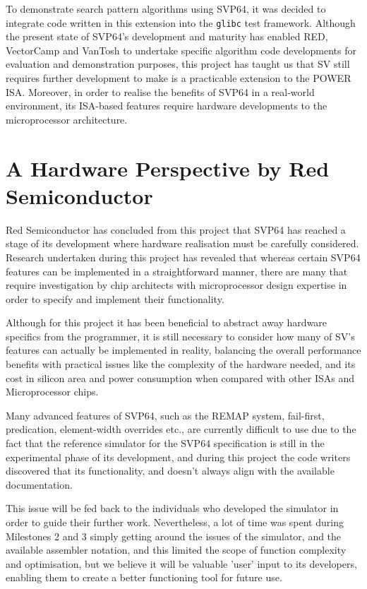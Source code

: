 To demonstrate search pattern algorithms using \acrshort{SVP64}, it was decided
to integrate code written in this extension into the \texttt{glibc}
test framework.
Although the present state of SVP64's development and maturity has enabled RED,
VectorCamp and VanTosh to undertake specific algorithm code developments for
evaluation and demonstration purposes, this project has taught us that
\acrshort{SV} still requires further development to make is a practicable
extension to the POWER ISA. Moreover, in order to realise the benefits of SVP64
in a real-world environment, its ISA-based features require hardware
developments to the microprocessor architecture.

\section{A Hardware Perspective by Red Semiconductor}

Red Semiconductor has concluded from this project that SVP64 has reached a
stage of its development where hardware realisation must be carefully
considered. Research undertaken during this project has revealed that whereas
certain SVP64 features can be implemented in a straightforward manner, there
are many that require investigation by chip architects with microprocessor
design expertise in order to specify and implement their functionality.

Although for this project it has been beneficial to abstract away hardware
specifics from the programmer, it is still necessary to consider how many of
\acrshort{SV}'s features can actually be implemented in reality,
balancing the overall performance benefits with practical issues like the
complexity of the hardware needed, and its cost in silicon area and power
consumption when compared with other ISAs and Microprocessor chips.

Many advanced features of SVP64, such as the REMAP system, fail-first,
predication, element-width overrides etc., are currently difficult to use
due to the fact that the reference simulator for the SVP64 specification is
still in the experimental phase of its development, and during this project the
code writers discovered that its functionality, and doesn't always align with
the available documentation.

This issue will be fed back to the individuals who developed the simulator in
order to guide their further work. Nevertheless, a lot of time was spent
during Milestones 2 and 3 simply getting around the issues of the simulator,
and the available assembler notation, and this limited the scope of function
complexity and optimisation, but we believe it will be valuable 'user' input
to its developers, enabling them to create a better functioning tool
for future use.

